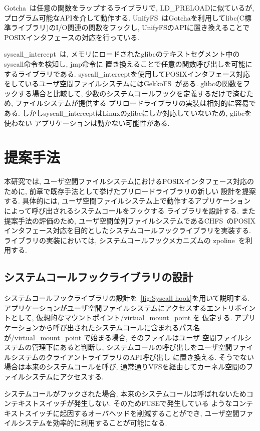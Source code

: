 \documentclass[a4paper,11pt]{jreport}
\begin{document}
Gotcha~\cite{gotcha}は任意の関数をラップするライブラリで, LD\_PRELOADに似ているが, プログラム可能なAPIを介して動作する. 
UnifyFS~\cite{10177390}はGotchaを利用してlibc(C標準ライブラリ)のI/O関連の関数をフックし, UnifyFSのAPIに置き換えることで
POSIXインタフェースの対応を行っている. 

syscall\_intercept~\cite{syscall-intercept}は, メモリにロードされたglibcのテキストセグメント中のsyscall命令を検知し, jmp命令に
置き換えることで任意の関数呼び出しを可能にするライブラリである.
syscall\_interceptを使用してPOSIXインタフェース対応をしているユーザ空間ファイルシステムにはGekkoFS~\cite{8514892}がある.
glibcの関数をフックする場合と比較して, 少数のシステムコールフックを定義するだけで済むため, ファイルシステムが提供する
プリロードライブラリの実装は相対的に容易である. しかしsyscall\_interceptはLinuxのglibcにしか対応していないため, glibcを使わない
アプリケーションは動かない可能性がある.

\chapter{提案手法}
本研究では, ユーザ空間ファイルシステムにおけるPOSIXインタフェース対応のために, 前章で既存手法として挙げたプリロードライブラリの新しい
設計を提案する. 具体的には, ユーザ空間ファイルシステム上で動作するアプリケーションによって呼び出されるシステムコールをフックする
ライブラリを設計する. また提案手法の評価のため, ユーザ空間並列ファイルシステムであるCHFS~\cite{tatebe2022chfs}のPOSIX
インタフェース対応を目的としたシステムコールフックライブラリを実装する. ライブラリの実装においては, システムコールフックメカニズムの
zpoline~\cite{288689}を利用する.


\section{システムコールフックライブラリの設計}
システムコールフックライブラリの設計を\figurename~\ref{fig:Syscall hook}を用いて説明する.
アプリケーションがユーザ空間ファイルシステムにアクセスするエントリポイントとして, 仮想的なマウントポイント/virtual\_mount\_point を
仮定する. アプリケーションから呼び出されたシステムコールに含まれるパス名が/virtual\_mount\_point で始まる場合, そのファイルはユーザ
空間ファイルシステムの管理下にあると判断し, システムコールの呼び出しをユーザ空間ファイルシステムのクライアントライブラリのAPI呼び出し
に置き換える. そうでない場合は本来のシステムコールを呼び, 通常通りVFSを経由してカーネル空間のファイルシステムにアクセスする.

システムコールがフックされた場合, 本来のシステムコールは呼ばれないためコンテキストスイッチが発生しない. そのためFUSEで発生している
ようなコンテキストスイッチに起因するオーバヘッドを削減することができ, ユーザ空間ファイルシステムを効率的に利用することが可能になる.
\end{document}
